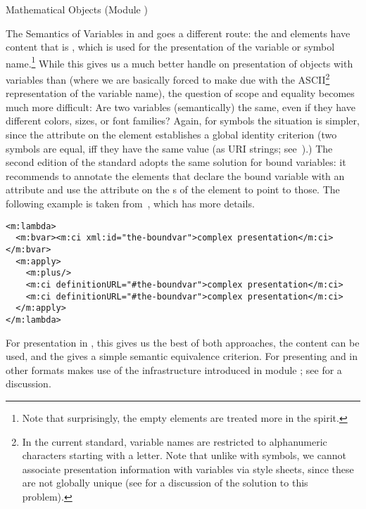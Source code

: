 \begin{tchapter}[id=mobj,short=Mathematical Objects]{Mathematical Objects (Module {})}
\begin{tsection}[id=sem-var,short=Semantics of Variables]{The Semantics of Variables in
    {\openmath} and {\cmathml}}
{\mathml} goes a different route: the {} and {}
elements have content that is {\pmathml}, which is used for the presentation of the
variable or symbol name.\footnote{Note that surprisingly, the empty {\cmathml} elements
  are treated more in the {\openmath} spirit.}  While this gives us a much better handle
on presentation of objects with variables than {\openmath} (where we are basically forced
to make due with the ASCII\footnote{In the current {\openmath} standard, variable names
  are restricted to alphanumeric characters starting with a letter. Note that unlike with
  symbols, we cannot associate presentation information with variables via style sheets,
  since these are not globally unique (see {} for a discussion of the
  {\omdoc} solution to this problem).}  representation of the variable name), the question
of scope and equality becomes much more difficult: Are two variables (semantically) the
same, even if they have different colors, sizes, or font families? Again, for symbols the
situation is simpler, since the {} attribute on the
{} element establishes a global identity criterion (two symbols are
equal, iff they have the same {} value (as URI
strings; see~\cite{BerFie:uri98}).) The second edition of the {\mathml} standard adopts
the same solution for bound variables: it recommends to annotate the {}
elements that declare the bound variable with an {} attribute and
use the {} attribute on the {s}
of the {} element to point to those. The following example is taken
from~\cite{KohDev:bvm03}, which has more details.

\begin{lstlisting}[language=MathML,label=bvar-mathml,
     index={math,bvar,ci,definitionURL}]
<m:lambda>
  <m:bvar><m:ci xml:id="the-boundvar">complex presentation</m:ci></m:bvar>
  <m:apply>
    <m:plus/>
    <m:ci definitionURL="#the-boundvar">complex presentation</m:ci>
    <m:ci definitionURL="#the-boundvar">complex presentation</m:ci>
  </m:apply>
</m:lambda>  
\end{lstlisting}

For presentation in {\mathml}, this gives us the best of both approaches, the
{} content can be used, and the {} gives a simple
semantic equivalence criterion. For presenting {\openmath} and {\cmathml} in other
formats {\omdoc} makes use of the infrastructure introduced in module
{}; see {} for a discussion.
\end{tsection}


\end{tchapter}
